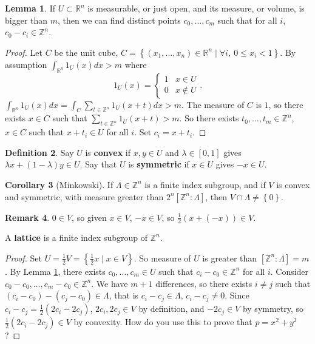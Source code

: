 \documentclass{article}
\newcommand{\Z}{\mathbb{Z}}
\newcommand{\R}{\mathbb{R}}
\newcommand{\rb}[1]{\left( #1 \right)}
\renewcommand{\sb}[1]{\left[ #1 \right]}
\newcommand{\cb}[1]{\left\{ #1 \right\}}
\theoremstyle{definition}\newtheorem{definition}{Definition}[section]
\theoremstyle{definition}\newtheorem{remark}[definition]{Remark}
\theoremstyle{definition}\newtheorem*{example}{Example}
\theoremstyle{definition}\newtheorem*{note}{Note}
\newtheorem{lemma}[definition]{Lemma}
\newtheorem{corollary}[definition]{Corollary}
\begin{document}
\begin{lemma}
\label{lem:4.1}
If $ U \subset \R^n $ is measurable, or just open, and its measure, or volume, is bigger than $ m $, then we can find distinct points $ c_0, \dots, c_m $ such that for all $ i $, $ c_0 - c_i \in \Z^n $.
\end{lemma}

\begin{proof}
Let $ C $ be the unit cube, $ C = \cb{\rb{x_1, \dots, x_n} \in \R^n \mid \forall i, \ 0 \le x_i < 1} $. By assumption $ \int_{\R^n} 1_U\rb{x} dx > m $ where
$$ 1_U\rb{x} = \begin{cases} 1 & x \in U \\ 0 & x \notin U \end{cases}. $$
$ \int_{\R^n} 1_U\rb{x} dx = \int_C \sum_{t \in \Z^n} 1_U\rb{x + t}dx > m $. The measure of $ C $ is $ 1 $, so there exists $ x \in C $ such that $ \sum_{t \in \Z^n} 1_U\rb{x + t} > m $. So there exists $ t_0, \dots, t_m \in \Z^n $, $ x \in C $ such that $ x + t_i \in U $ for all $ i $. Set $ c_i = x + t_i $.
\end{proof}

\begin{definition}
Say $ U $ is \textbf{convex} if $ x, y \in U $ and $ \lambda \in \sb{0, 1} $ gives $ \lambda x + \rb{1 - \lambda}y \in U $. Say that $ U $ is \textbf{symmetric} if $ x \in U $ gives $ -x \in U $.
\end{definition}

\begin{corollary}[Minkowski]
\label{cor:4.3}
If $ \Lambda \in \Z^n $ is a finite index subgroup, and if $ V $ is convex and symmetric, with measure greater than $ 2^n\sb{\Z^n : \Lambda} $, then $ V \cap \Lambda \ne \cb{0} $.
\end{corollary}

\begin{remark}
$ 0 \in V $, so given $ x \in V $, $ -x \in V $, so $ \tfrac{1}{2}\rb{x + \rb{-x}} \in V $.
\end{remark}

A \textbf{lattice} is a finite index subgroup of $ \Z^n $.

\begin{proof}
Set $ U = \tfrac{1}{2}V = \cb{\tfrac{1}{2}x \mid x \in V} $. So measure of $ U $ is greater than $ \sb{\Z^n : \Lambda} = m $. By Lemma \ref{lem:4.1}, there exists $ c_0, \dots, c_m \in U $ such that $ c_i - c_0 \in \Z^n $ for all $ i $. Consider $ c_0 - c_0, \dots, c_m - c_0 \in \Z^n $. We have $ m + 1 $ differences, so there exists $ i \ne j $ such that $ \rb{c_i - c_0} - \rb{c_j - c_0} \in \Lambda $, that is $ c_i - c_j \in \Lambda $, $ c_i - c_j \ne 0 $. Since $ c_i - c_j = \tfrac{1}{2}\rb{2c_i - 2c_j} $, $ 2c_i, 2c_j \in V $ by definition, and $ -2c_j \in V $ by symmetry, so $ \tfrac{1}{2}\rb{2c_i - 2c_j} \in V $ by convexity. How do you use this to prove that $ p = x^2 + y^2 $?
\end{proof}
\end{document}
